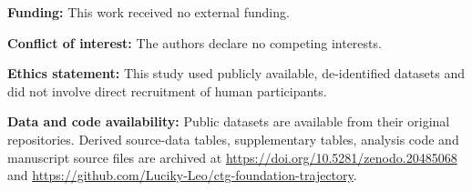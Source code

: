 \documentclass[11pt]{article}
\begin{document}
        \textbf{Funding:} This work received no external funding.

        \textbf{Conflict of interest:} The authors declare no competing interests.

        \textbf{Ethics statement:} This study used publicly available, de-identified datasets and did not involve direct recruitment of human participants.

        \textbf{Data and code availability:} Public datasets are available from their original repositories. Derived source-data tables, supplementary tables, analysis code and manuscript source files are archived at \url{https://doi.org/10.5281/zenodo.20485068} and \url{https://github.com/Luciky-Leo/ctg-foundation-trajectory}.

        
\end{document}
